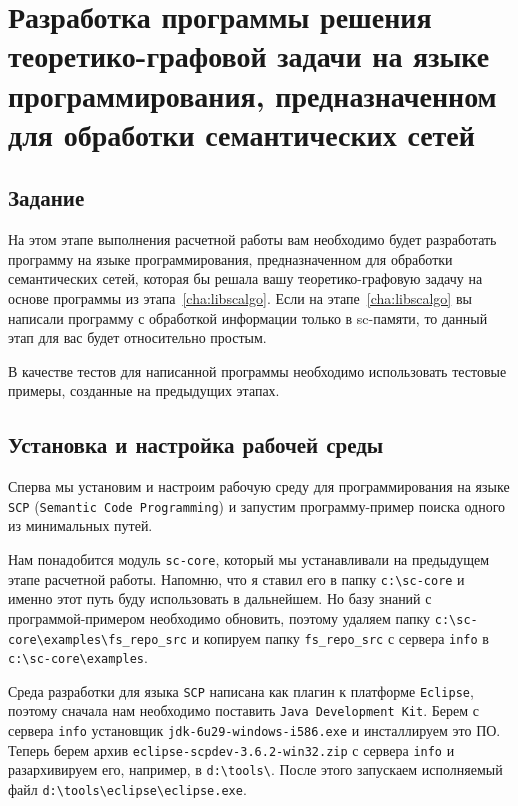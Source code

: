 
\chapter{Разработка программы решения теоретико-графовой задачи на
  языке программирования, предназначенном для обработки семантических
  сетей}
\label{cha:scpalgo}

\section{Задание}

На этом этапе выполнения расчетной работы вам необходимо будет
разработать программу на языке программирования, предназначенном для
обработки семантических сетей, которая бы решала вашу
теоретико-графовую задачу на основе программы из
этапа~\ref{cha:libscalgo}. Если на этапе~\ref{cha:libscalgo} вы
написали программу с обработкой информации только в sc-памяти, то
данный этап для вас будет относительно простым.

В качестве тестов для написанной программы необходимо использовать
тестовые примеры, созданные на предыдущих этапах.

\section{Установка и настройка рабочей среды}
\label{sec:scpalgo_setup}

Сперва мы установим и настроим рабочую среду для программирования на
языке \texttt{SCP} (\texttt{Semantic Code Programming}) и запустим
программу-пример поиска одного из минимальных путей.

Нам понадобится модуль \texttt{sc-core}, который мы устанавливали на
предыдущем этапе расчетной работы. Напомню, что я ставил его в папку
\verb|c:\sc-core| и именно этот путь буду использовать в
дальнейшем. Но базу знаний с программой-примером необходимо обновить,
поэтому удаляем папку \verb|c:\sc-core\examples\fs_repo_src| и
копируем папку \verb|fs_repo_src| с сервера \texttt{info} в
\verb|c:\sc-core\examples|.

Среда разработки для языка \texttt{SCP} написана как плагин к
платформе \texttt{Eclipse}, поэтому сначала нам необходимо поставить
\texttt{Java Development Kit}. Берем с сервера \texttt{info}
установщик \texttt{jdk-6u29-windows-i586.exe} и инсталлируем это
ПО. Теперь берем архив \texttt{eclipse-scpdev-3.6.2-win32.zip} с
сервера \texttt{info} и разархивируем его, например, в
\verb|d:\tools\|. После этого запускаем исполняемый файл
\verb|d:\tools\eclipse\eclipse.exe|.

